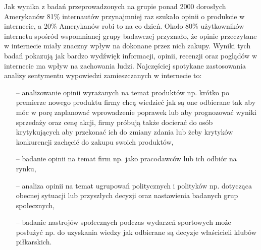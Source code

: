 Jak wynika z badań przeprowadzonych na grupie ponad 2000 dorosłych Amerykanów 81\% internautów przynajmniej raz szukało opinii o produkcie w internecie, a 20\% Amerykanów robi to na co dzień. Około 80\% użytkowników internetu spośród wspomnianej grupy badawczej przyznało, że opinie przeczytane w internecie miały znaczny wpływ na dokonane przez nich zakupy. Wyniki tych badań pokazują jak bardzo wydźwięk informacji, opinii, recenzji oraz poglądów w internecie ma wpływ na zachowania ludzi. Najczęściej spotykane zastosowania analizy sentymentu wypowiedzi zamieszczanych w internecie to:
\begin{itemize}
	\item[--] analizowanie opinii wyrażanych na temat produktów np. krótko po premierze nowego produktu firmy chcą wiedzieć jak są one odbierane tak aby móc w porę zaplanować wprowadzenie poprawek lub aby prognozować wyniki sprzedaży oraz cenę akcji, firmy próbują także docierać do osób krytykujących aby przekonać ich do zmiany zdania lub żeby krytyków konkurencji zachęcić do zakupu swoich produktów,
	\item[--] badanie opinii na temat firm np. jako pracodawców lub ich odbiór na rynku,
	\item[--] analiza opinii na temat ugrupowań politycznych i polityków np. dotycząca obecnej sytuacji lub przyszłych decyzji oraz nastawienia badanych grup społecznych,
	\item[--] badanie nastrojów społecznych podczas wydarzeń sportowych może posłużyć np. do uzyskania wiedzy jak odbierane są decyzje właścicieli klubów piłkarskich. 
\end{itemize}

   


